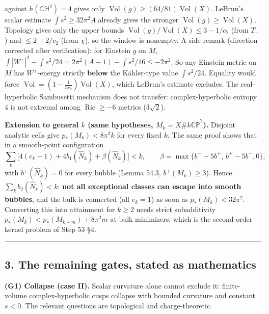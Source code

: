 \documentclass[
  10pt,
]{report}
\begin{document}
\begin{enumerate}
  against \(h(\mathbb{CH}^2)=4\) gives only
  \(\operatorname{Vol}(g)\ge(64/81)\operatorname{Vol}(X)\). LeBrun's
  scalar estimate \(\int s^2\ge32\pi^2A\) already gives the stronger
  \(\operatorname{Vol}(g)\ge\operatorname{Vol}(X)\). Topology gives only
  the upper bounds
  \(\operatorname{Vol}(g)/\operatorname{Vol}(X)\le3-1/c_2\) (from
  \(T_+\)) and \(\le2+2/c_2\) (from \(\chi\)), so the window is
  nonempty. A side remark (direction corrected after verification): for
  Einstein \(g\) on \(M\),
  \(\int|W^+|^2-\int s^2/24=2\pi^2(A-1)-\int s^2/16\le-2\pi^2\). So any
  Einstein metric on \(M\) has \(W^+\)-energy strictly \textbf{below}
  the Kähler-type value \(\int s^2/24\). Equality would force
  \(\operatorname{Vol}=(1-\frac1{3c_2})\operatorname{Vol}(X)\), which
  LeBrun's estimate excludes. The real-hyperbolic Sambusetti mechanism
  does not transfer: complex-hyperbolic entropy \(4\) is not extremal
  among \(\operatorname{Ric}\ge-6\) metrics (\(3\sqrt2\)).
\end{enumerate}

\textbf{Extension to general \(k\) (same hypotheses,
\(M_k=X\#k\overline{\mathbb{CP}}^2\)).} Disjoint analytic cells give
\(p_*(M_k)<8\pi^2k\) for every fixed \(k\). The same proof shows that in
a smooth-point configuration \[
\sum_k\big[4(e_k-1)+4b_1(\widehat N_k)+\beta(\widehat N_k)\big]<k,\qquad
\beta=\max\{b^--5b^+,\,b^+-5b^-,0\},
\] with \(b^+(\widehat N_k)=0\) for every bubble (Lemma 54.3,
\(b^+(M_k)\ge3\)). Hence \(\sum_kb_2(\widehat N_k)<k\): \textbf{not all
exceptional classes can escape into smooth bubbles}, and the bulk is
connected (all \(e_k=1\)) as soon as \(p_*(M_k)<32\pi^2\). Converting
this into attainment for \(k\ge2\) needs strict subadditivity
\(p_*(M_k)<p_*(M_{k-m})+8\pi^2m\) at bulk minimizers, which is the
second-order kernel problem of Step 53 §4.

\begin{center}\rule{0.5\linewidth}{0.5pt}\end{center}

\hypertarget{the-remaining-gates-stated-as-mathematics}{%
\subsection{3. The remaining gates, stated as
mathematics}\label{the-remaining-gates-stated-as-mathematics}}

\textbf{(G1) Collapse (case II).} Scalar curvature alone cannot exclude
it: finite-volume complex-hyperbolic cusps collapse with bounded
curvature and constant \(s<0\). The relevant questions are topological
and charge-theoretic.
\end{document}
